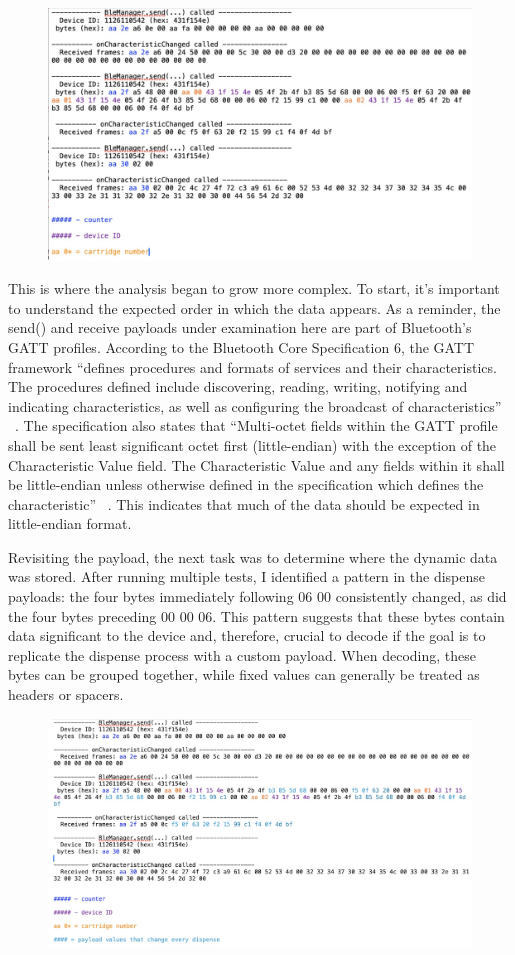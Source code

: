 \begin{figure}[H]
	\centering
	\includegraphics[width=0.7\linewidth]{payload3}
	\caption{}
	\label{fig:payload3}
\end{figure}

This is where the analysis began to grow more complex. To start, it’s important to understand the expected order in which the data appears. As a reminder, the send() and receive payloads under examination here are part of Bluetooth’s GATT profiles. According to the Bluetooth Core Specification 6, the GATT framework “defines procedures and formats of services and their characteristics. The procedures defined include discovering, reading, writing, notifying and indicating characteristics, as well as configuring the broadcast of characteristics” ~\cite{bluetooth2023}. The specification also states that “Multi-octet fields within the GATT profile shall be sent least significant octet first (little-endian) with the exception of the Characteristic Value field. The Characteristic Value and any fields within it shall be little-endian unless otherwise defined in the specification which defines the characteristic” ~\cite{bluetooth2023}. This indicates that much of the data should be expected in little-endian format.

Revisiting the payload, the next task was to determine where the dynamic data was stored. After running multiple tests, I identified a pattern in the dispense payloads: the four bytes immediately following 06 00 consistently changed, as did the four bytes preceding 00 00 06. This pattern suggests that these bytes contain data significant to the device and, therefore, crucial to decode if the goal is to replicate the dispense process with a custom payload. When decoding, these bytes can be grouped together, while fixed values can generally be treated as headers or spacers.

\begin{figure}[H]
	\centering
	\includegraphics[width=0.7\linewidth]{payload4}
	\caption{}
	\label{fig:payload4}
\end{figure}

